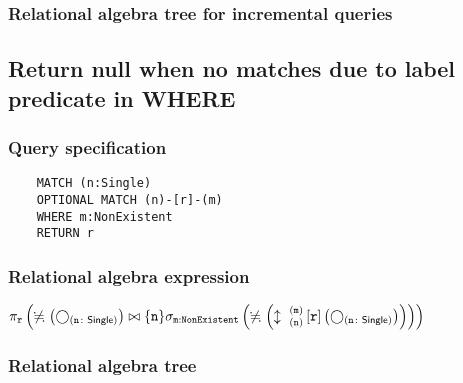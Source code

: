 	\subsubsection*{Relational algebra tree for incremental queries}

	\subsection{Return null when no matches due to label predicate in WHERE}

	\subsubsection*{Query specification}

	\begin{lstlisting}
	MATCH (n:Single)
	OPTIONAL MATCH (n)-[r]-(m)
	WHERE m:NonExistent
	RETURN r
	\end{lstlisting}


	\subsubsection*{Relational algebra expression}

	$\projection{\var{r}} \left(\alldifferent{} \left(\getvertices{n}{Single}\right) \join \{\var{n}\} \selection{\mathtt{m:NonExistent}} \left(\alldifferent{} \left(\expandboth{n}{m}{}{r}{} \left(\getvertices{n}{Single}\right)\right)\right)\right)$

	\subsubsection*{Relational algebra tree}

